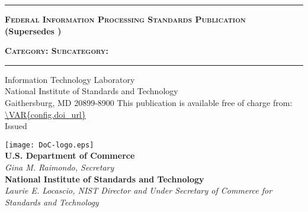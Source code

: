 
\begin{titlepage}


\sffamily

\LARGE{\textbf{}}
\vspace{8pt}
\hrule
\vspace{8pt}
\large{\textbf{\textsc{Federal Information Processing Standards Publication}}}\\
\small{\textbf{(Supersedes )}}

\vfill
\huge{\textbf{}}
\vfill
\normalsize{\textbf{\textsc{Category: 
\hfill Subcategory: 
}}}
\vspace{8pt}
\hrule
\vfill

Information Technology Laboratory\\
National Institute of Standards and Technology\\
Gaithersburg, MD 20899-8900
\vfill
\normalsize This publication is available free of charge from:\\
\url{\VAR{config.doi_url}}\\
\vfill
\normalsize Issued 
\vfill

\texttt{[image: DoC-logo.eps]}\\ 
\vfill
\footnotesize \textbf{U.S. Department of Commerce}\\ 
\textit{Gina M. Raimondo, Secretary}\\
\vspace{10pt}
\textbf{National Institute of Standards and Technology}\\ 
\textit{Laurie E. Locascio, NIST Director and Under Secretary of Commerce for Standards and Technology}  
\end{titlepage}
